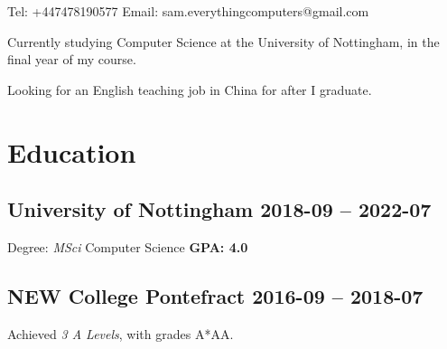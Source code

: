 \documentclass[cv.tex]{subfiles}
\begin{document}
\title{}
\author{Sam Robert Whitehead}

\maketitle

\pagestyle{empty}
\thispagestyle{empty}

Tel:
+447478190577
\hfill
Email:
sam.everythingcomputers@gmail.com

\vspace{2mm}
Currently studying Computer Science at the University of Nottingham, in the
final year of my course.

Looking for an English teaching job in China for after I graduate.
\section{Education}
    \subsection{University of Nottingham
        \hfill 2018-09 -- 2022-07}
        Degree: \emph{MSci} Computer Science
        \hfill
        \textbf{GPA: 4.0}
    \subsection{NEW College Pontefract
        \hfill 2016-09 -- 2018-07}
        Achieved \emph{3 A Levels}, with grades
        A*AA\footnotemark[2].
\end{document}
